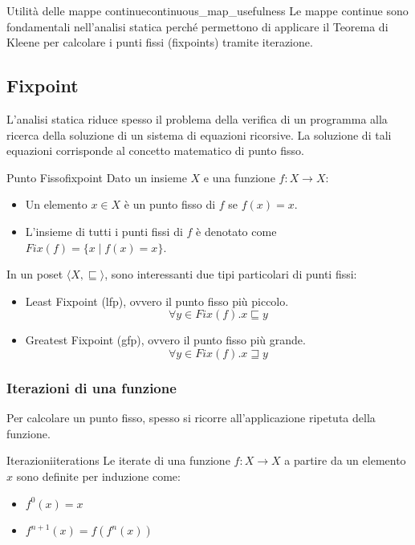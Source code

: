 \begin{nota}{Utilità delle mappe continue}{continuous_map_usefulness}
Le mappe continue sono fondamentali nell'analisi statica perché permettono di
applicare il Teorema di Kleene per calcolare i punti fissi (fixpoints)
tramite iterazione.
\end{nota}

\subsection{Fixpoint}\label{subsec:fixpoint}

L'analisi statica riduce spesso il problema della verifica di un programma
alla ricerca della soluzione di un sistema di equazioni ricorsive.
La soluzione di tali equazioni corrisponde al concetto matematico di punto
fisso.

\begin{definizione}{Punto Fisso}{fixpoint}
Dato un insieme $X$ e una funzione $f: X \to X$:
\begin{itemize}
    \item Un elemento $x \in X$ è un punto fisso di $f$ se $f(x) = x$.
    \item L'insieme di tutti i punti fissi di $f$ è denotato come
    $Fix(f) = \{ x \mid f(x) = x \}$.
\end{itemize}
\end{definizione}

In un poset $\langle X, \sqsubseteq \rangle$, sono interessanti due tipi
particolari di punti fissi:
\begin{itemize}
    \item Least Fixpoint (lfp), ovvero il punto fisso più piccolo.
    \[ \forall y \in Fix(f) . x \sqsubseteq y \]
    \item Greatest Fixpoint (gfp), ovvero il punto fisso più grande.
    \[ \forall y \in Fix(f) . x \sqsupseteq y \]
\end{itemize}

\subsubsection{Iterazioni di una funzione}

Per calcolare un punto fisso, spesso si ricorre all'applicazione ripetuta
della funzione.

\begin{definizione}{Iterazioni}{iterations}
Le iterate di una funzione $f: X \to X$ a partire da un elemento $x$ sono
definite per induzione come:
\begin{itemize}
    \item $f^0(x) = x$
    \item $f^{n+1}(x) = f(f^n(x))$
\end{itemize}
\end{definizione}

